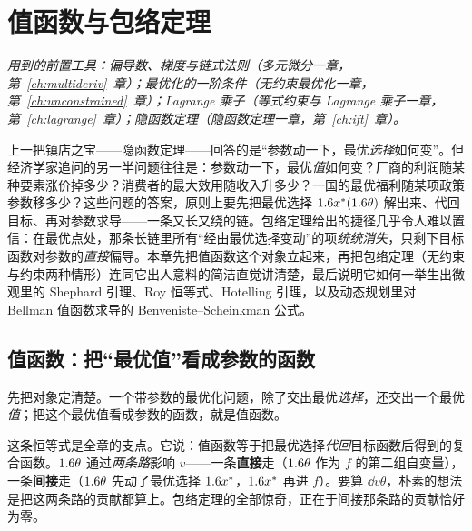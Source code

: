 \chapter{值函数与包络定理}
\label{ch:envelope}

\noindent\emph{用到的前置工具：偏导数、梯度与链式法则（多元微分一章，第~\ref{ch:multideriv}~章）；最优化的一阶条件（无约束最优化一章，第~\ref{ch:unconstrained}~章）；Lagrange 乘子（等式约束与 Lagrange 乘子一章，第~\ref{ch:lagrange}~章）；隐函数定理（隐函数定理一章，第~\ref{ch:ift}~章）。}
\medskip

上一把镇店之宝——隐函数定理——回答的是``参数动一下，最优\emph{选择}如何变''。但经济学家追问的另一半问题往往是：参数动一下，最优\emph{值}如何变？厂商的利润随某种要素涨价掉多少？消费者的最大效用随收入升多少？一国的最优福利随某项政策参数移多少？这些问题的答案，原则上要先把最优选择 $1.6 x^*(1.6\theta)$ 解出来、代回目标、再对参数求导——一条又长又绕的链。包络定理给出的捷径几乎令人难以置信：在最优点处，那条长链里所有``经由最优选择变动''的项\emph{统统消失}，只剩下目标函数对参数的\emph{直接}偏导。本章先把值函数这个对象立起来，再把包络定理（无约束与约束两种情形）连同它出人意料的简洁直觉讲清楚，最后说明它如何一举生出微观里的 Shephard 引理、Roy 恒等式、Hotelling 引理，以及动态规划里对 Bellman 值函数求导的 Benveniste--Scheinkman 公式。

\section{值函数：把``最优值''看成参数的函数}
\label{sec:envelope-valuefn}

先把对象定清楚。一个带参数的最优化问题，除了交出最优\emph{选择}，还交出一个最优\emph{值}；把这个最优值看成参数的函数，就是值函数。


这条恒等式是全章的支点。它说：值函数等于把最优选择\emph{代回}目标函数后得到的复合函数。$1.6\theta$ 通过\emph{两条路}影响 $v$——一条\textbf{直接}走（$1.6\theta$ 作为 $f$ 的第二组自变量），一条\textbf{间接}走（$1.6\theta$ 先动了最优选择 $1.6 x^*$，$1.6 x^*$ 再进 $f$）。要算 $\dd{v}{\theta}$，朴素的想法是把这两条路的贡献都算上。包络定理的全部惊奇，正在于间接那条路的贡献恰好为零。

